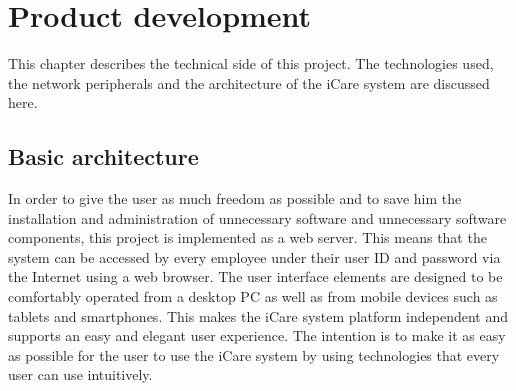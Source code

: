 \chapter{Product development}
This chapter describes the technical side of this project. The technologies used, the network peripherals and the architecture of the iCare system are discussed here.



\section{Basic architecture}
In order to give the user as much freedom as possible and to save him the installation and administration of unnecessary software and unnecessary software components, this project is implemented as a web server. This means that the system can be accessed by every employee under their user ID and password via the Internet using a web browser. The user interface elements are designed to be comfortably operated from a desktop PC as well as from mobile devices such as tablets and smartphones. This makes the iCare system platform independent and supports an easy and elegant user experience. The intention is to make it as easy as possible for the user to use the iCare system by using technologies that every user can use intuitively.

